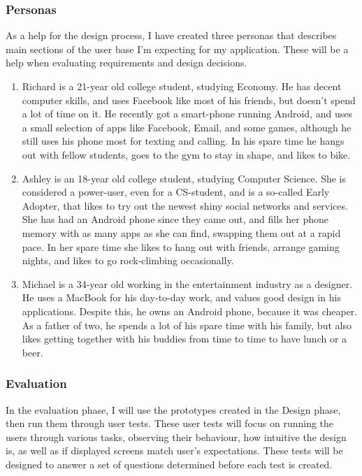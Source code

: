 \documentclass[]{report}
\begin{document}
\subsubsection{Personas}

As a help for the design process, I have created three personas that describes
main sections of the user base I'm expecting for my application. These will be a
help when evaluating requirements and design decisions.

\begin{enumerate}
\item Richard is a 21-year old college student, studying Economy. He has decent
  computer skills, and uses Facebook like most of his friends, but doesn't spend
  a lot of time on it. He recently got a smart-phone running Android, and uses a
  small selection of apps like Facebook, Email, and some games, although he
  still uses his phone most for texting and calling. In his spare time he hangs
  out with fellow students, goes to the gym to stay in shape, and likes to bike.
\item Ashley is an 18-year old college student, studying Computer Science. She
  is considered a power-user, even for a CS-student, and is a so-called Early
  Adopter, that likes to try out the newest shiny social networks and
  services. She has had an Android phone since they came out, and fills her
  phone memory with as many apps as she can find, swapping them out at a rapid
  pace. In her spare time she likes to hang out with friends, arrange gaming
  nights, and likes to go rock-climbing occasionally.
\item Michael is a 34-year old working in the entertainment industry as a
  designer. He uses a MacBook for his day-to-day work, and values good design in
  his applications. Despite this, he owns an Android phone, because it was
  cheaper. As a father of two, he spends a lot of his spare time with his
  family, but also likes getting together with his buddies from time to time to
  have lunch or a beer.
\end{enumerate}

\subsubsection{Evaluation}

In the evaluation phase, I will use the prototypes created in the Design phase,
then run them through user tests. These user tests will focus on running the
users through various tasks, observing their behaviour, how intuitive the
design is, as well as if displayed screens match user's expectations. These
tests will be designed to answer a set of questions determined before each test
is created.
\end{document}
